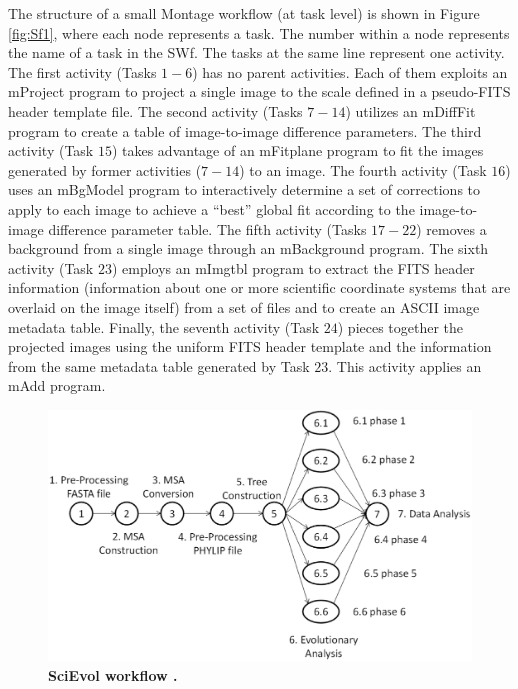 The structure of a small Montage workflow (at task level) is shown in Figure \ref{fig:Sf1}, where each node represents a task.
The number within a node represents the name of a task in the SWf. The tasks at the same line represent one activity.
The first activity (Tasks $1-6$) has no parent activities. Each of them exploits an mProject program to project a single image to the scale defined in a pseudo-FITS header template file. The second activity (Tasks $7-14$) utilizes an mDiffFit program to create a table of image-to-image difference parameters. The third activity (Task $15$) takes advantage of an mFitplane program to fit the images generated by former activities ($7-14$) to an image. 
The fourth activity (Task $16$) uses an mBgModel program to interactively determine a set of corrections to apply to each image to achieve a \textquotedblleft{}best\textquotedblright{} global fit according to the image-to-image difference parameter table. The fifth activity (Tasks $17-22$) removes a background from a single image through an mBackground program. 
The sixth activity (Task $23$) employs an mImgtbl program to extract the FITS header information (information about one or more scientific coordinate systems that are overlaid on the image itself) from a set of files and to create an ASCII image metadata table. Finally, the seventh activity (Task $24$) pieces together the projected images using the uniform FITS header template and the information from the same metadata table generated by Task $23$. This activity applies an mAdd program. 

\begin{figure}
\centering{}
\captionsetup{justification=centering}
\includegraphics[width=129mm]{figures/f2}\caption{\textbf{SciEvol workflow \cite{Ocana2012}. }}
\label{fig:Sf2} 
\end{figure}


